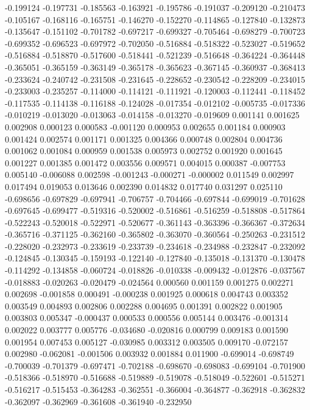 -0.199124
-0.197731
-0.185563
-0.163921
-0.195786
-0.191037
-0.209120
-0.210473
-0.105167
-0.168116
-0.165751
-0.146270
-0.152270
-0.114865
-0.127840
-0.132873
-0.135647
-0.151102
-0.701782
-0.697217
-0.699327
-0.705464
-0.698279
-0.700723
-0.699352
-0.696523
-0.697972
-0.702050
-0.516884
-0.518322
-0.523027
-0.519652
-0.516884
-0.518870
-0.517600
-0.518441
-0.521239
-0.516648
-0.364224
-0.364448
-0.365051
-0.365159
-0.363149
-0.365178
-0.365623
-0.367145
-0.360937
-0.368413
-0.233624
-0.240742
-0.231508
-0.231645
-0.228652
-0.230542
-0.228209
-0.234015
-0.233003
-0.235257
-0.114000
-0.114121
-0.111921
-0.120003
-0.112441
-0.118452
-0.117535
-0.114138
-0.116188
-0.124028
-0.017354
-0.012102
-0.005735
-0.017336
-0.010219
-0.013020
-0.013063
-0.014158
-0.013270
-0.019609
0.001141
0.001625
0.002908
0.000123
0.000583
-0.001120
0.000953
0.002655
0.001184
0.000903
0.001424
0.002574
0.001171
0.001325
0.004366
0.000748
0.002804
0.004736
0.001062
0.001084
0.000959
0.001538
0.005973
0.002752
0.001920
0.001645
0.001227
0.001385
0.001472
0.003556
0.009571
0.004015
0.000387
-0.007753
0.005140
-0.006088
0.002598
-0.001243
-0.000271
-0.000002
0.011549
0.002997
0.017494
0.019053
0.013646
0.002390
0.014832
0.017740
0.031297
0.025110
-0.698656
-0.697829
-0.697941
-0.706757
-0.704466
-0.697844
-0.699019
-0.701628
-0.697645
-0.699477
-0.519316
-0.520002
-0.516861
-0.516259
-0.518808
-0.517864
-0.522243
-0.520018
-0.522971
-0.520677
-0.361143
-0.363396
-0.366367
-0.372634
-0.365716
-0.371125
-0.362160
-0.365802
-0.363070
-0.360564
-0.250263
-0.231512
-0.228020
-0.232973
-0.233619
-0.233739
-0.234618
-0.234988
-0.232847
-0.232092
-0.124845
-0.130345
-0.159193
-0.122140
-0.127840
-0.135018
-0.131370
-0.130478
-0.114292
-0.134858
-0.060724
-0.018826
-0.010338
-0.009432
-0.012876
-0.037567
-0.018883
-0.020263
-0.020479
-0.024564
0.000560
0.001159
0.001275
0.002271
0.002698
-0.001858
0.000491
-0.000238
0.001925
0.000618
0.004743
0.003352
0.003549
0.004893
0.002806
0.002288
0.004695
0.001391
0.002822
0.001905
0.003803
0.005347
-0.000437
0.000533
0.000556
0.005144
0.003476
-0.001314
0.002022
0.003777
0.005776
-0.034680
-0.020816
0.000799
0.009183
0.001590
0.001954
0.007453
0.005127
-0.030985
0.003312
0.003505
0.009170
-0.072157
0.002980
-0.062081
-0.001506
0.003932
0.001884
0.011900
-0.699014
-0.698749
-0.700039
-0.701379
-0.697471
-0.702188
-0.698670
-0.698083
-0.699104
-0.701900
-0.518366
-0.518970
-0.516688
-0.519889
-0.519078
-0.518049
-0.522601
-0.515271
-0.516217
-0.515453
-0.364283
-0.362551
-0.366004
-0.364877
-0.362918
-0.362832
-0.362097
-0.362969
-0.361608
-0.361940
-0.232950
